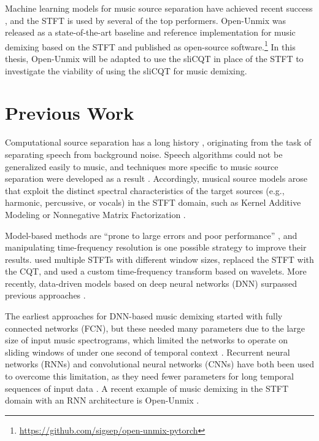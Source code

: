 \documentclass[letter,12pt]{article}
\begin{document}
Machine learning models for music source separation have achieved recent success \parencite{sisec2018}, and the STFT is used by several of the top performers. Open-Unmix \parencite{umx} was released as a state-of-the-art baseline and reference implementation for music demixing based on the STFT and published as open-source software.\footnote{\url{https://github.com/sigsep/open-unmix-pytorch}} In this thesis, Open-Unmix will be adapted to use the sliCQT in place of the STFT to investigate the viability of using the sliCQT for music demixing.

\section{Previous Work}

Computational source separation has a long history \parencite{musicsepgood}, originating from the task of separating speech from background noise. Speech algorithms could not be generalized easily to music, and techniques more specific to music source separation were developed as a result \parencite{musicsepintro1}. Accordingly, musical source models arose that exploit the distinct spectral characteristics of the target sources (e.g., harmonic, percussive, or vocals) in the STFT domain, such as Kernel Additive Modeling or Nonnegative Matrix Factorization \parencite{musicsepgood}.

Model-based methods are ``prone to large errors and poor performance'' \parencite[13]{musicsepintro1}, and manipulating time-frequency resolution is one possible strategy to improve their results. \textcite{driedger} used multiple STFTs with different window sizes, \textcite{fitzgerald2} replaced the STFT with the CQT, and \textcite{wavelets} used a custom time-frequency transform based on wavelets. More recently, data-driven models based on deep neural networks (DNN) surpassed previous approaches \parencite{sisec2018, musicsepintro1}.

The earliest approaches for DNN-based music demixing started with fully connected networks (FCN), but these needed many parameters due to the large size of input music spectrograms, which limited the networks to operate on sliding windows of under one second of temporal context \parencite{musicsepgood}. Recurrent neural networks (RNNs) \parencite{umxorig1} and convolutional neural networks (CNNs) \parencite{plumbley1} have both been used to overcome this limitation, as they need fewer parameters for long temporal sequences of input data \parencite{musicsepgood}. A recent example of music demixing in the STFT domain with an RNN architecture is Open-Unmix \parencite{umx}.
\end{document}
